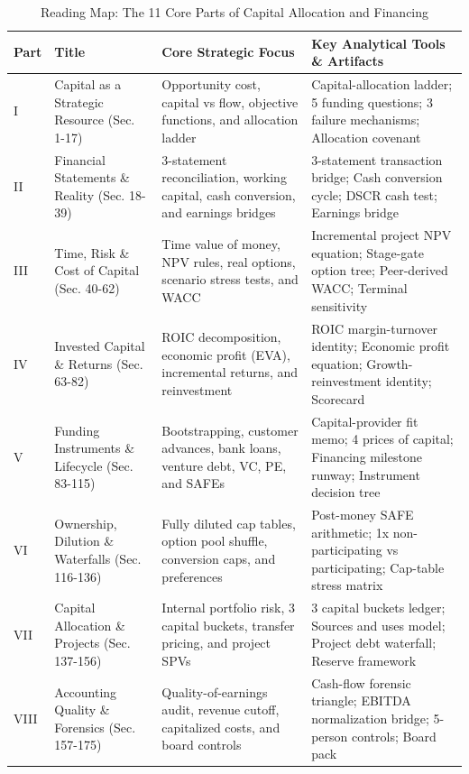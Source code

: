 \begin{table}[t]
\centering
\small
\caption{Reading Map: The 11 Core Parts of Capital Allocation and Financing}
\label{tab:ch32_reading_map}
\begin{tabularx}{\textwidth}{p{1.8cm} p{2.8cm} p{4.4cm} X}
\toprule
\textbf{Part} & \textbf{Title} & \textbf{Core Strategic Focus} & \textbf{Key Analytical Tools \& Artifacts} \\
\midrule
I & Capital as a Strategic Resource (Sec. 1-17) & Opportunity cost, capital vs flow, objective functions, and allocation ladder & Capital-allocation ladder; 5 funding questions; 3 failure mechanisms; Allocation covenant \\
II & Financial Statements \& Reality (Sec. 18-39) & 3-statement reconciliation, working capital, cash conversion, and earnings bridges & 3-statement transaction bridge; Cash conversion cycle; DSCR cash test; Earnings bridge \\
III & Time, Risk \& Cost of Capital (Sec. 40-62) & Time value of money, NPV rules, real options, scenario stress tests, and WACC & Incremental project NPV equation; Stage-gate option tree; Peer-derived WACC; Terminal sensitivity \\
IV & Invested Capital \& Returns (Sec. 63-82) & ROIC decomposition, economic profit (EVA), incremental returns, and reinvestment & ROIC margin-turnover identity; Economic profit equation; Growth-reinvestment identity; Scorecard \\
V & Funding Instruments \& Lifecycle (Sec. 83-115) & Bootstrapping, customer advances, bank loans, venture debt, VC, PE, and SAFEs & Capital-provider fit memo; 4 prices of capital; Financing milestone runway; Instrument decision tree \\
VI & Ownership, Dilution \& Waterfalls (Sec. 116-136) & Fully diluted cap tables, option pool shuffle, conversion caps, and preferences & Post-money SAFE arithmetic; 1x non-participating vs participating; Cap-table stress matrix \\
VII & Capital Allocation \& Projects (Sec. 137-156) & Internal portfolio risk, 3 capital buckets, transfer pricing, and project SPVs & 3 capital buckets ledger; Sources and uses model; Project debt waterfall; Reserve framework \\
VIII & Accounting Quality \& Forensics (Sec. 157-175) & Quality-of-earnings audit, revenue cutoff, capitalized costs, and board controls & Cash-flow forensic triangle; EBITDA normalization bridge; 5-person controls; Board pack \\

\end{tabularx}
\end{table}
